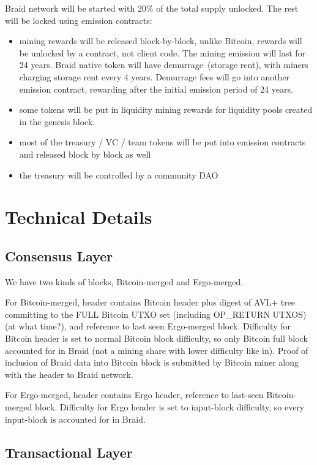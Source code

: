 \documentclass{llncs}   %
\newcommand{\bc}{Braid}
\begin{document}
\bc{} network will be started with 20\% of the total supply unlocked. The rest will be locked using emission contracts:
\begin{itemize}
  \item mining rewards will be released block-by-block, unlike Bitcoin, rewards will be unlocked by a contract, not client code. The mining emission will last for 24 years. \bc{} native token will have demurrage~(storage rent), with miners charging storage rent every 4 years. Demurrage fees will go into another emission contract, rewarding after the initial emission period of 24 years.
  \item some tokens will be put in liquidity mining rewards for liquidity pools created in the genesis block.
  \item most of the treasury / VC / team tokens will be put into emission contracts and released block by block as well
  \item the treasury will be controlled by a community DAO
\end{itemize}


\section{Technical Details}
\label{sec-techdetails}

\subsection{Consensus Layer}

We have two kinds of blocks, Bitcoin-merged and Ergo-merged.

For Bitcoin-merged, header contains Bitcoin header plus digest of AVL+ tree committing to the FULL Bitcoin UTXO set (including OP\_RETURN UTXOS) (at what time?), and reference to last seen Ergo-merged block. Difficulty for Bitcoin header is set to normal Bitcoin block difficulty, so only Bitcoin full block accounted for in Braid (not a mining share with lower difficulty like in). Proof of inclusion of Braid data into Bitcoin block is submitted by Bitcoin miner along with the header to Braid network.

For Ergo-merged, header contains Ergo header, reference to last-seen Bitcoin-merged block. Difficulty for Ergo header is set to input-block difficulty, so every input-block is accounted for in Braid. 


\subsection{Transactional Layer}
\end{document}
